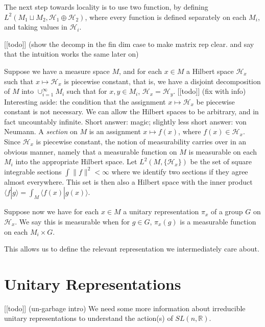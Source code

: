 \documentclass[
]{article}
\begin{document}
The next step towards locality is to use two function, by defining
\(L^2(M_1 \sqcup M_2, \mathscr{H}_1 \oplus \mathscr{H}_2)\), where every
function is defined separately on each \(M_i\), and taking values in
\(\mathscr{H}_i\).

{[}{[}todo{]}{]} (show the decomp in the fin dim case to make matrix rep
clear. and say that the intuition works the same later on)

Suppose we have a measure space \(M\), and for each \(x \in M\) a
Hilbert space \(\mathscr{H}_x\) such that \(x \mapsto \mathscr{H}_x\) is
piecewise constant, that is, we have a disjoint decomposition of \(M\)
into \(\cup_{i=1}^{\infty} M_i\) such that for \(x,y \in M_i\),
\(\mathscr{H}_x = \mathscr{H}_y\). {[}{[}todo{]}{]} (fix with info)
Interesting aside: the condition that the assignment
\(x \mapsto \mathscr{H}_x\) be piecewise constant is not necessary. We
can allow the Hilbert spaces to be arbitrary, and in fact uncountably
infinite. Short answer: magic; slightly less short answer: von Neumann.
A \emph{section} on \(M\) is an assignment \(x \mapsto f(x)\), where
\(f(x) \in \mathscr{H}_x\). Since \(\mathscr{H}_x\) is piecewise
constant, the notion of measurability carries over in an obvious manner,
namely that a measurable function on \(M\) is measurable on each \(M_i\)
into the appropriate Hilbert space. Let \(L^2(M, \{\mathscr{H}_x\})\) be
the set of square integrable sections \(\int \| f \|^2 < \infty\) where
we identify two sections if they agree almost everywhere. This set is
then also a Hilbert space with the inner product
\(\langle f | g \rangle = \int_M \langle f(x) | g(x) \rangle\).

Suppose now we have for each \(x \in M\) a unitary representation
\(\pi_x\) of a group \(G\) on \(\mathscr{H}_x\). We say this is
measurable when for \(g \in G\), \(\pi_x(g)\) is a measurable function
on each \(M_i \times G\).

This allows us to define the relevant representation we intermediately
care about.

\hypertarget{unitary-representations}{%
\section{Unitary Representations}\label{unitary-representations}}

{[}{[}todo{]}{]} (un-garbage intro) We need some more information about
irreducible unitary representations to understand the action(s) of
\(SL(n, \mathbb{R})\).
\end{document}

